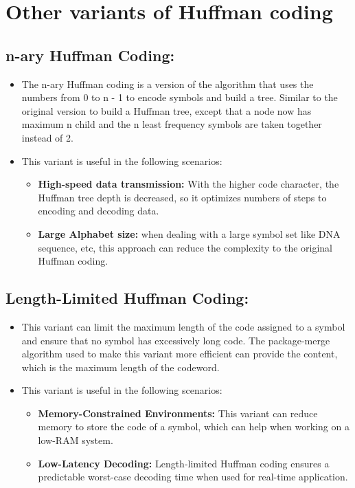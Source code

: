 \section{Other variants of Huffman coding}
\subsection{n-ary Huffman Coding:}
\begin{itemize}
    \item The n-ary Huffman coding is a version of the algorithm that uses the numbers from 0 to n - 1 to encode symbols and build a tree. Similar to the original version to build a Huffman tree, except that a node now has maximum n child and the n least frequency symbols are taken together instead of 2. 
    \item This variant is useful in the following scenarios:
    \begin{itemize}
        \item \textbf{High-speed data transmission:} With the higher code character, the Huffman tree depth is decreased, so it optimizes numbers of steps to encoding and decoding data.
        \item \textbf{Large Alphabet size:} when dealing with a large symbol set like DNA sequence, etc, this approach can reduce the complexity to the original Huffman coding.
    \end{itemize}
\end{itemize}
\subsection{Length-Limited Huffman Coding:}
\begin{itemize}
    \item This variant can limit the maximum length of the code assigned to a symbol and ensure that no symbol has excessively long code. The package-merge algorithm used to make this variant more efficient can provide the content, which is the maximum length of the codeword. 
    \item This variant is useful in the following scenarios:
    \begin{itemize}
        \item \textbf{Memory-Constrained Environments:} This variant can reduce memory to store the code of a symbol, which can help when working on a low-RAM system.
        \item \textbf{Low-Latency Decoding:} Length-limited Huffman coding ensures a predictable worst-case decoding time when used for real-time application. 
    \end{itemize}
\end{itemize}

